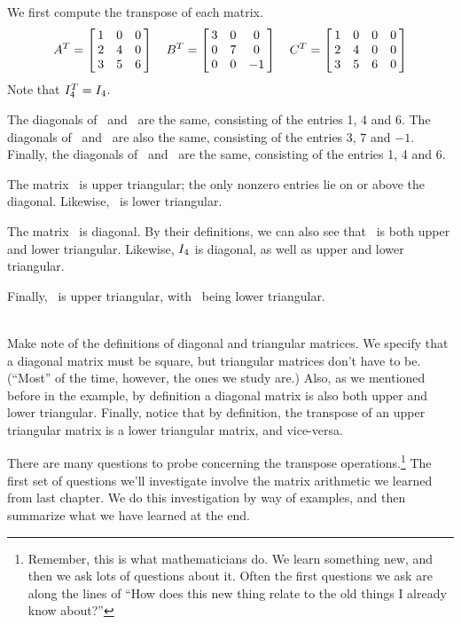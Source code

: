 {We first compute the transpose of each matrix.
$$\ttat = \bmx{ccc}1&0&0\\2&4&0\\3&5&6\emx\quad \ttbt = \bmx{ccc}3&0&0\\0&7&0\\0&0&-1\emx\quad \ttct = \bmx{cccc}1&0&0&0\\2&4&0&0\\3&5&6&0\emx$$
Note that $\ttit_4 = \tti_4$.

The diagonals of \tta\ and \ttat\ are the same, consisting of the entries 1, 4 and 6. The diagonals of \ttb\ and \ttbt\ are also the same, consisting of the entries 3, 7 and $-1$. Finally, the diagonals of \ttc\ and \ttct\ are the same, consisting of the entries 1, 4 and 6.

The matrix \tta\ is upper triangular; the only nonzero entries lie on or above the diagonal. Likewise, \ttat\ is lower triangular.

The matrix \ttb\ is diagonal. By their definitions, we can also see that \ttb\ is both upper and lower triangular. Likewise, $\tti_4$ is diagonal, as well as upper and lower triangular.

Finally, \ttc\ is upper triangular, with \ttct\ being lower triangular. }\\ %

Make note of the definitions of diagonal and triangular matrices. We specify that a diagonal matrix must be square, but triangular matrices don't have to be. (``Most'' of the time, however, the ones we study are.) Also, as we mentioned before in the example, by definition a diagonal matrix is also both upper and lower triangular. Finally, notice that by definition, the transpose of an upper triangular matrix is a lower triangular matrix, and vice-versa.

There are many questions to probe concerning the transpose operations.\footnote{Remember, this is what mathematicians do. We learn something new, and then we ask lots of questions about it. Often the first questions we ask are along the lines of ``How does this new thing relate to the old things I already know about?''} The first set of questions we'll investigate involve the matrix arithmetic we learned from last chapter. We do this investigation by way of examples, and then summarize what we have learned at the end.\\

